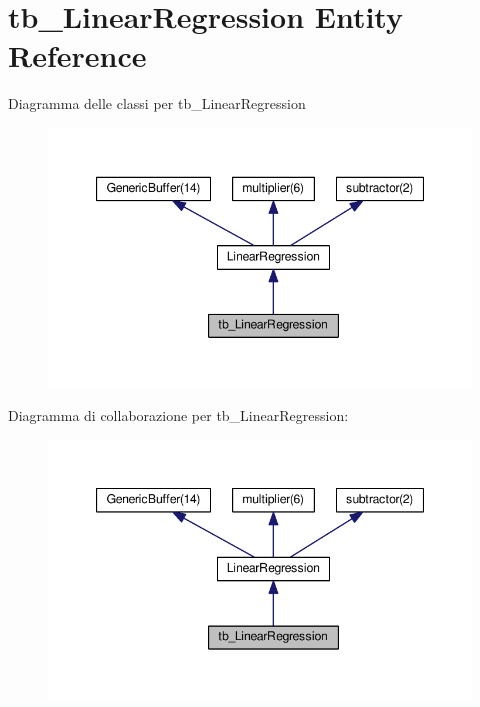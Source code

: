 \hypertarget{classtb___linear_regression}{}\section{tb\+\_\+\+Linear\+Regression Entity Reference}
\label{classtb___linear_regression}


Diagramma delle classi per tb\+\_\+\+Linear\+Regression\nopagebreak
\begin{figure}[H]
\begin{center}
\leavevmode
\includegraphics[width=347pt]{classtb___linear_regression__inherit__graph}
\end{center}
\end{figure}


Diagramma di collaborazione per tb\+\_\+\+Linear\+Regression\+:\nopagebreak
\begin{figure}[H]
\begin{center}
\leavevmode
\includegraphics[width=347pt]{classtb___linear_regression__coll__graph}
\end{center}
\end{figure}
